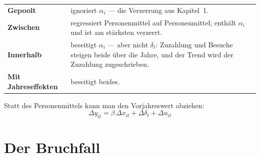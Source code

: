 \begin{merksatz}
\begin{center}
{\small
\renewcommand{\arraystretch}{1.55}
\begin{tabular}{@{}P{2.4cm}P{6.2cm}@{}}
\toprule
\textbf{Gepoolt} & ignoriert $\alpha_i$ --- die Verzerrung aus Kapitel~1.\\
\textbf{Zwischen} & regressiert Personenmittel auf Personenmittel; enthält  $\alpha_i$ und ist am stärksten verzerrt.\\
\textbf{Innerhalb} & beseitigt $\alpha_i$ --- aber nicht $\delta_t$: Zuzahlung und Besuche steigen beide über die Jahre, und der Trend wird der Zuzahlung zugeschrieben.\\
\textbf{Mit Jahreseffekten} & beseitigt beides.\\
\bottomrule
\end{tabular}}
\end{center}

\begin{center}
\begin{minipage}{0.88\textwidth}
\end{minipage}
\end{center}

Statt des Personenmittels kann man den Vorjahreswert abziehen:
\[ \Delta y_{it} = \beta\,\Delta x_{it} + \Delta\delta_t + \Delta u_{it} \]
\end{merksatz}

\section{Der Bruchfall}

